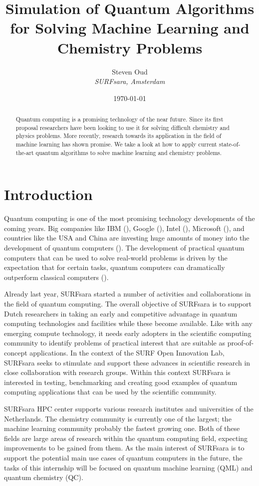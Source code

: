 \documentclass[a4paper,10pt]{article}
\title{Simulation of Quantum Algorithms for Solving Machine Learning and Chemistry Problems}
\author{Steven Oud \\ \emph{SURFsara, Amsterdam}}
\date{\today}
\begin{document}
\maketitle

\begin{abstract}
Quantum computing is a promising technology of the near future.
Since its first proposal researchers have been looking to use it for solving difficult chemistry and physics problems.
More recently, research towards its application in the field of machine learning has shown promise.
We take a look at how to apply current state-of-the-art quantum algorithms to solve machine learning and chemistry problems.
\end{abstract}

\tableofcontents

\section{Introduction}
Quantum computing is one of the most promising technology developments of the coming years.
Big companies like IBM (\cite{ibm-quantum}), Google (\cite{google-quantum}), Intel (\cite{intel-quantum}), Microsoft (\cite{microsoft-quantum}), and countries like the USA and China are investing huge amounts of money into the development of quantum computers (\cite{usa-quantum, china-quantum}).
The development of practical quantum computers that can be used to solve real-world problems is driven by the expectation that for certain tasks, quantum computers can dramatically outperform classical computers (\cite{preskill-qc}).

Already last year, SURFsara started a number of activities and collaborations in the field of quantum computing.
The overall objective of SURFsara is to support Dutch researchers in taking an early and competitive advantage in quantum computing technologies and facilities while these become available.
Like with any emerging compute technology, it needs early adopters in the scientific computing community to identify problems of practical interest that are suitable as proof-of-concept applications.
In the context of the SURF Open Innovation Lab, SURFsara seeks to stimulate and support these advances in scientific research in close collaboration with research groups.
Within this context SURFsara is interested in testing, benchmarking and creating good examples of quantum computing applications that can be used by the scientific community.

SURFsara HPC center supports various research institutes and universities of the Netherlands.
The chemistry community is currently one of the largest; the machine learning community probably the fastest growing one.
Both of these fields are large areas of research within the quantum computing field, expecting improvements to be gained from them.
As the main interest of SURFsara is to support the potential main use cases of quantum computers in the future, the tasks of this internship will be focused on quantum machine learning (QML) and quantum chemistry (QC).
\end{document}
